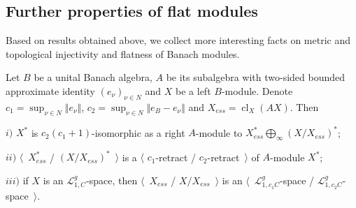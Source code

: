 
\subsection{Further properties of flat modules}
\label{SubSectionFurtherPropertiesOfFlatModules}

Based on results obtained above, we collect more interesting facts on metric and topological injectivity and flatness of Banach modules.

\begin{proposition}\label{DualBanModDecomp} Let $B$ be a unital Banach algebra, $A$ be its subalgebra with two-sided bounded approximate identity $(e_\nu)_{\nu\in N}$ and $X$ be a left $B$-module. Denote $c_1=\sup_{\nu\in N}\Vert e_\nu\Vert$, $c_2=\sup_{\nu\in N}\Vert e_B-e_\nu\Vert$ and $X_{ess}=\operatorname{cl}_X(AX)$. Then 

$i)$ $X^*$ is $c_2(c_1+1)$-isomorphic as a right $A$-module to $X_{ess}^*\bigoplus_\infty (X/X_{ess})^*$;

$ii)$ $\langle$~$X_{ess}^*$ / $(X/X_{ess})^*$~$\rangle$ is a $\langle$ $c_1$-retract / $c_2$-retract~$\rangle$ of $A$-module $X^*$;

$iii)$ if $X$ is an $\mathscr{L}_{1,C}^g$-space, then $\langle$~$X_{ess}$ / $X/X_{ess}$~$\rangle$ is an $\langle$~$\mathscr{L}_{1,c_1C}^g$-space / $\mathscr{L}_{1,c_2C}^g$-space~$\rangle$.

\end{proposition}
